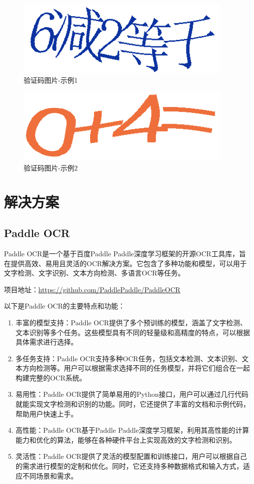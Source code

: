 \begin{figure}
	\centering
	\includegraphics[width=0.7\linewidth]{Resources/Picture/test1_20240102160004_server}
	\caption{验证码图片-示例1}
	\label{fig:test120240102160004server}
\end{figure}

\begin{figure}
	\centering
	\includegraphics[width=0.7\linewidth]{Resources/Picture/test2_20240102160811_server}
	\caption{验证码图片-示例2}
	\label{fig:test220240102160811server}
\end{figure}

\section{解决方案}

\subsection{Paddle OCR}

Paddle OCR是一个基于百度Paddle Paddle深度学习框架的开源OCR工具库，旨在提供高效、易用且灵活的OCR解决方案。它包含了多种功能和模型，可以用于文字检测、文字识别、文本方向检测、多语言OCR等任务。

项目地址：\url{https://github.com/PaddlePaddle/PaddleOCR}

以下是Paddle OCR的主要特点和功能：

\begin{enumerate}
	\item 丰富的模型支持：Paddle OCR提供了多个预训练的模型，涵盖了文字检测、文本识别等多个任务。这些模型具有不同的轻量级和高精度的特点，可以根据具体需求进行选择。
	\item 多任务支持：Paddle OCR支持多种OCR任务，包括文本检测、文本识别、文本方向检测等。用户可以根据需求选择不同的任务模型，并将它们组合在一起构建完整的OCR系统。
	\item 易用性：Paddle OCR提供了简单易用的Python接口，用户可以通过几行代码就能实现文字检测和识别的功能。同时，它还提供了丰富的文档和示例代码，帮助用户快速上手。
	\item 高性能：Paddle OCR基于Paddle Paddle深度学习框架，利用其高性能的计算能力和优化的算法，能够在各种硬件平台上实现高效的文字检测和识别。
	\item 灵活性：Paddle OCR提供了灵活的模型配置和训练接口，用户可以根据自己的需求进行模型的定制和优化。同时，它还支持多种数据格式和输入方式，适应不同场景和需求。
\end{enumerate}

